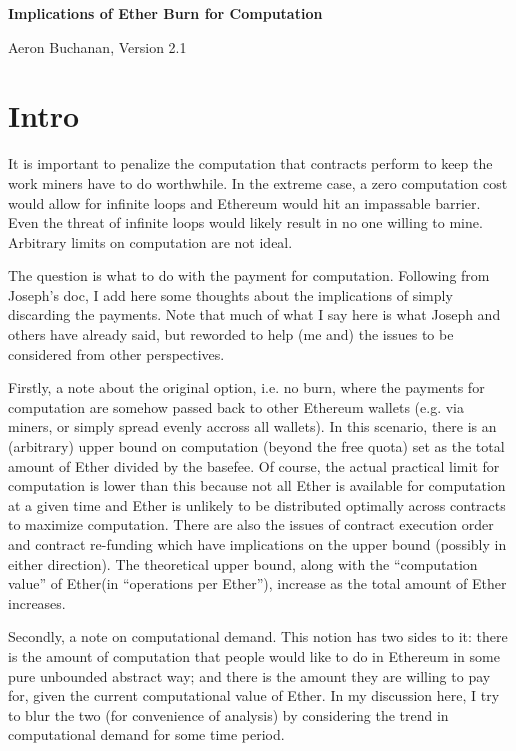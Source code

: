 \documentclass[11pt,a4paper]{article}
\begin{document}
\def\ether{Ether\xspace}
\def\ie{{i.e.}\xspace}
\def\eg{{e.g.}\xspace}

\begin{center}
{\LARGE\bf Implications of \ether Burn for Computation}

Aeron Buchanan, Version 2.1
\end{center} 

\vspace*{-1cm}
\section*{Intro}

It is important to penalize the computation that contracts perform to keep the work miners have to do worthwhile. In the extreme case, a zero computation cost would allow for infinite loops and Ethereum would hit an impassable barrier. Even the threat of infinite loops would likely result in no one willing to mine. Arbitrary limits on computation are not ideal. 

The question is what to do with the payment for computation. Following from Joseph's doc, I add here some thoughts about the implications of simply discarding the payments. Note that much of what I say here is what Joseph and others have already said, but reworded to help (me and) the issues to be considered from other perspectives. 

Firstly, a note about the original option, \ie no burn, where the payments for computation are somehow passed back to other Ethereum wallets (\eg via miners, or simply spread evenly accross all wallets). In this scenario, there is an (arbitrary) upper bound on computation (beyond the free quota) set as the total amount of \ether divided by the basefee. Of course, the actual practical limit for computation is lower than this because not all \ether is available for computation at a given time and \ether is unlikely to be distributed optimally across contracts to maximize computation. There are also the issues of contract execution order and contract re-funding which have implications on the upper bound (possibly in either direction). The theoretical upper bound, along with the ``computation value'' of \ether (in ``operations per \ether''), increase as the total amount of \ether increases. 

Secondly, a note on computational demand. This notion has two sides to it: there is the amount of computation that people would like to do in Ethereum in some pure unbounded abstract way; and there is the amount they are willing to pay for, given the current computational value of \ether. In my discussion here, I try to blur the two (for convenience of analysis) by considering the trend in computational demand for some time period.
\end{document}
